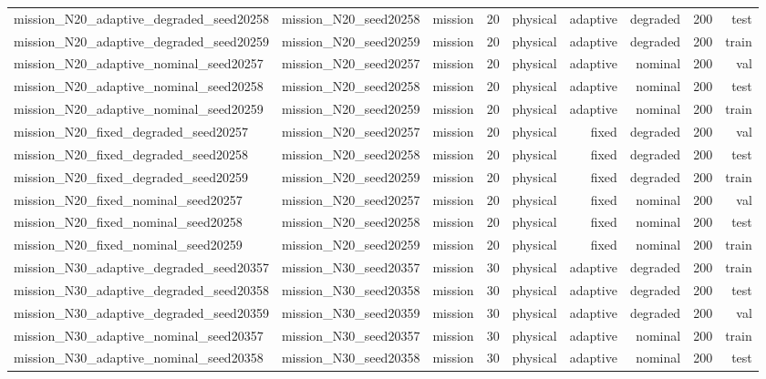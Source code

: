 \begin{tabular}{lrrrrrrrr}
mission\_N20\_adaptive\_degraded\_seed20258 & mission\_N20\_seed20258 & mission & 20 & physical & adaptive & degraded & 200 & test \\
mission\_N20\_adaptive\_degraded\_seed20259 & mission\_N20\_seed20259 & mission & 20 & physical & adaptive & degraded & 200 & train \\
mission\_N20\_adaptive\_nominal\_seed20257 & mission\_N20\_seed20257 & mission & 20 & physical & adaptive & nominal & 200 & val \\
mission\_N20\_adaptive\_nominal\_seed20258 & mission\_N20\_seed20258 & mission & 20 & physical & adaptive & nominal & 200 & test \\
mission\_N20\_adaptive\_nominal\_seed20259 & mission\_N20\_seed20259 & mission & 20 & physical & adaptive & nominal & 200 & train \\
mission\_N20\_fixed\_degraded\_seed20257 & mission\_N20\_seed20257 & mission & 20 & physical & fixed & degraded & 200 & val \\
mission\_N20\_fixed\_degraded\_seed20258 & mission\_N20\_seed20258 & mission & 20 & physical & fixed & degraded & 200 & test \\
mission\_N20\_fixed\_degraded\_seed20259 & mission\_N20\_seed20259 & mission & 20 & physical & fixed & degraded & 200 & train \\
mission\_N20\_fixed\_nominal\_seed20257 & mission\_N20\_seed20257 & mission & 20 & physical & fixed & nominal & 200 & val \\
mission\_N20\_fixed\_nominal\_seed20258 & mission\_N20\_seed20258 & mission & 20 & physical & fixed & nominal & 200 & test \\
mission\_N20\_fixed\_nominal\_seed20259 & mission\_N20\_seed20259 & mission & 20 & physical & fixed & nominal & 200 & train \\
mission\_N30\_adaptive\_degraded\_seed20357 & mission\_N30\_seed20357 & mission & 30 & physical & adaptive & degraded & 200 & train \\
mission\_N30\_adaptive\_degraded\_seed20358 & mission\_N30\_seed20358 & mission & 30 & physical & adaptive & degraded & 200 & test \\
mission\_N30\_adaptive\_degraded\_seed20359 & mission\_N30\_seed20359 & mission & 30 & physical & adaptive & degraded & 200 & val \\
mission\_N30\_adaptive\_nominal\_seed20357 & mission\_N30\_seed20357 & mission & 30 & physical & adaptive & nominal & 200 & train \\
mission\_N30\_adaptive\_nominal\_seed20358 & mission\_N30\_seed20358 & mission & 30 & physical & adaptive & nominal & 200 & test \\

\end{tabular}
